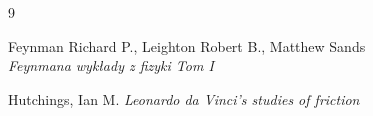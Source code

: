 \documentclass[a4paper,12pt,twocolumn]{extarticle}
\begin{document}
  \clearpage
  \onecolumn
  \begin{thebibliography}{9}
        
    Feynman Richard P., Leighton Robert B., Matthew Sands\\
    \textit{Feynmana wykłady z fizyki Tom I}

    Hutchings, Ian M.
    \textit{Leonardo da Vinci's studies of friction}
  \end{thebibliography}
\end{document}
